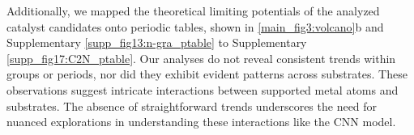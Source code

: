 Additionally, we mapped the theoretical limiting potentials of the analyzed catalyst candidates onto periodic tables, shown in \cref{main_fig3:volcano}b and Supplementary \cref{supp_fig13:n-gra_ptable} to Supplementary \cref{supp_fig17:C2N_ptable}.
Our analyses do not reveal consistent trends within groups or periods, nor did they exhibit evident patterns across substrates.
These observations suggest intricate interactions between supported metal atoms and substrates.
The absence of straightforward trends underscores the need for nuanced explorations in understanding these interactions like the CNN model.
